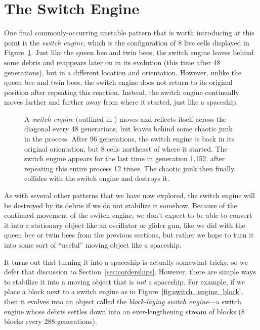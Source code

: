 \section{The Switch Engine}\label{sec:switch_engine}

One final commonly-occurring unstable pattern that is worth introducing at this point is the \emph{switch engine}, which is the configuration of 8 live cells displayed in Figure~\ref{fig:switch_engine}. Just like the queen bee and twin bees, the switch engine leaves behind some debris and reappears later on in its evolution (this time after 48 generations), but in a different location and orientation. However, unlike the queen bee and twin bees, the switch engine does not return to its original position after repeating this reaction. Instead, the switch engine continually moves farther and farther away from where it started, just like a spaceship.

\begin{figure}[!htb]
	\centering{}
	\caption{A \emph{switch engine} (outlined in ) moves and reflects itself across the diagonal every 48 generations, but leaves behind some chaotic junk in the process. After 96 generations, the switch engine is back in its original orientation, but 8 cells northeast of where it started. The switch engine appears for the last time in generation 1,152, after repeating this entire process 12 times. The chaotic junk then finally collides with the switch engine and destroys it.}\label{fig:switch_engine}
\end{figure}

As with several other patterns that we have now explored, the switch engine will be destroyed by its debris if we do not stabilize it somehow. Because of the continued movement of the switch engine, we don't expect to be able to convert it into a stationary object like an oscillator or glider gun, like we did with the queen bee or twin bees from the previous sections, but rather we hope to turn it into some sort of ``useful'' moving object like a spaceship.

It turns out that turning it into a spaceship is actually somewhat tricky, so we defer that discussion to Section~\ref{sec:corderships}. However, there are simple ways to stabilize it into a moving object that is \emph{not} a spaceship. For example, if we place a block next to a switch engine as in Figure~\ref{fig:switch_engine_block}, then it evolves into an object called the \emph{block-laying switch engine}---a switch engine whose debris settles down into an ever-lengthening stream of blocks (8 blocks every 288 generations).

